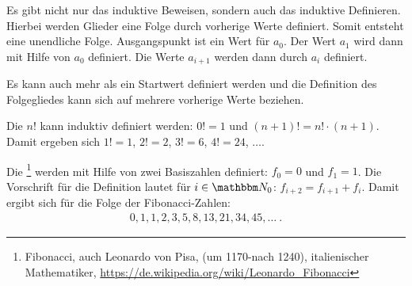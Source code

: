 \begin{Unit}
Es gibt nicht nur das induktive Beweisen, sondern auch das induktive Definieren.
Hierbei werden Glieder eine Folge durch vorherige Werte definiert. Somit 
entsteht eine unendliche Folge. Ausgangspunkt ist ein Wert für $a_0$. Der Wert
$a_1$ wird dann mit Hilfe von $a_0$ definiert. Die Werte $a_{i+1}$ werden dann
durch $a_i$ definiert.

Es kann auch mehr als ein Startwert definiert werden und die Definition des 
Folgegliedes kann sich auf mehrere vorherige Werte beziehen.
\end{Unit}

\begin{Unit}
Die  $n!$ kann induktiv definiert werden: $0! = 1$ und 
$(n+1)! = n! \cdot (n+1)$. Damit ergeben sich $1! = 1$, $2! = 2$, $3! = 6$, 
$4! = 24$, $\ldots$. 
\end{Unit}

\begin{Unit}
Die 
\footnote{Fibonacci, auch Leonardo von Pisa, (um 1170-nach 1240), 
italienischer Mathematiker, 
\url{https://de.wikipedia.org/wiki/Leonardo_Fibonacci}} 
werden mit Hilfe von zwei Basiszahlen definiert: $f_0 = 0$ und $f_1 = 1$. 
Die Vorschrift für die Definition lautet für $i \in \NN_0$: $f_{i+2} = f_{i+1} 
+ f_i$. Damit ergibt sich für die Folge der Fibonacci-Zahlen:
\begin{align*}
  0, 1, 1, 2, 3, 5, 8, 13, 21, 34, 45, \ldots \ .
\end{align*}
\end{Unit}
